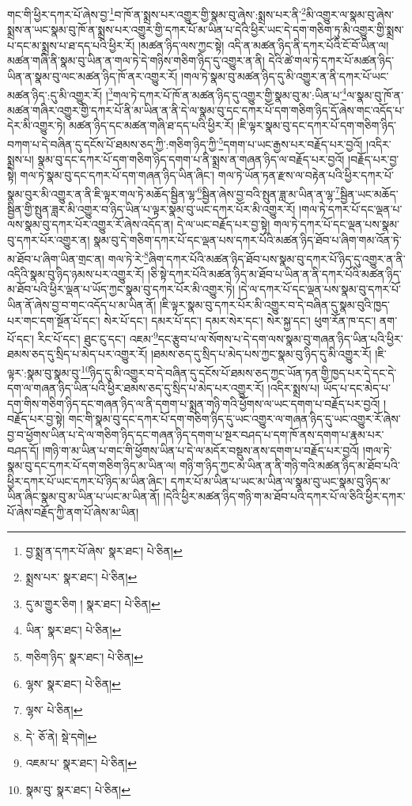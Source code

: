 གང་གི་ཕྱིར་དཀར་པོ་ཞེས་བྱ་\footnote{བྱ་སྨྲ་ན་དཀར་པོ་ཞེས་  སྣར་ཐང་།  པེ་ཅིན། }བ་ཁོ་ན་སྨྲས་པར་འགྱུར་གྱི་སྣམ་བུ་ཞེས་:སྨྲས་པར་ནི་\footnote{སྨྲས་པར་  སྣར་ཐང་།  པེ་ཅིན། }མི་འགྱུར་ལ་སྣམ་བུ་ཞེས་སྨྲས་ན་ཡང་སྣམ་བུ་ཁོ་ན་སྨྲས་པར་འགྱུར་གྱི་དཀར་པོ་མ་ཡིན་པ་དེའི་ཕྱིར་ཡང་དེ་དག་གཅིག་ཏུ་མི་འགྱུར་གྱི་སྨྲས་པ་དང་མ་སྨྲས་པ་ཐ་དད་པའི་ཕྱིར་རོ། །མཚན་ཉིད་ལས་ཀྱང་སྟེ། འདི་ན་མཚན་ཉིད་ནི་དཀར་པོའི་ངོ་བོ་ཡིན་ལ། མཚན་གཞི་ནི་སྣམ་བུ་ཡིན་ན་གལ་ཏེ་དེ་གཉིས་གཅིག་ཉིད་དུ་འགྱུར་ན་ནི། དེའི་ཚེ་གལ་ཏེ་དཀར་པོ་མཚན་ཉིད་ཡིན་ན་སྣམ་བུ་ལང་མཚན་ཉིད་ཁོ་ནར་འགྱུར་རོ། །གལ་ཏེ་སྣམ་བུ་མཚན་ཉིད་དུ་མི་འགྱུར་ན་ནི་དཀར་པོ་ཡང་མཚན་ཉིད་:དུ་མི་འགྱུར་རོ། །\footnote{དུ་མ་གྱུར་ཅིག །  སྣར་ཐང་།  པེ་ཅིན། }གལ་ཏེ་དཀར་པོ་ཁོ་ན་མཚན་ཉིད་དུ་འགྱུར་གྱི་སྣམ་བུ་མ་:ཡིན་པ་\footnote{ཡིན་  སྣར་ཐང་།  པེ་ཅིན། }ལ་སྣམ་བུ་ཁོ་ན་མཚན་གཞིར་འགྱུར་གྱི་དཀར་པོ་ནི་མ་ཡིན་ན་ནི་དེ་ལ་སྣམ་བུ་དང་དཀར་པོ་དག་གཅིག་ཉིད་དོ་ཞེས་གང་འདོད་པ་དེར་མི་འགྱུར་ཏེ། མཚན་ཉིད་དང་མཚན་གཞི་ཐ་དད་པའི་ཕྱིར་རོ། །ཇི་ལྟར་སྣམ་བུ་དང་དཀར་པོ་དག་གཅིག་ཉིད་བཀག་པ་དེ་བཞིན་དུ་དངོས་པོ་ཐམས་ཅད་ཀྱི་:གཅིག་ཉིད་ཀྱི་\footnote{གཅིག་ཉིད་  སྣར་ཐང་།  པེ་ཅིན། }དགག་པ་ཡང་རྒྱས་པར་བརྗོད་པར་བྱའོ། །འདིར་སྨྲས་པ། སྣམ་བུ་དང་དཀར་པོ་དག་གཅིག་ཉིད་དགག་པ་ནི་སྨྲས་ན་གཞན་ཉིད་ལ་བརྗོད་པར་བྱའོ། །བརྗོད་པར་བྱ་སྟེ། གལ་ཏེ་སྣམ་བུ་དང་དཀར་པོ་དག་གཞན་ཉིད་ཡིན་ཞིང་། གལ་ཏེ་ཡོན་ཏན་རྫས་ལ་བརྟེན་པའི་ཕྱིར་དཀར་པོ་སྣམ་བུར་མི་འགྱུར་ན་ནི་ཇི་ལྟར་གལ་ཏེ་མཆོད་སྦྱིན་ལྷ་\footnote{ལྷས་  སྣར་ཐང་།  པེ་ཅིན། }སྦྱིན་ཞེས་བྱ་བའི་སྤུན་ཟླ་མ་ཡིན་ན་ལྷ་\footnote{ལྷས་  པེ་ཅིན། }སྦྱིན་ཡང་མཆོད་སྦྱིན་གྱི་སྤུན་ཟླར་མི་འགྱུར་བ་ཉིད་ཡིན་པ་ལྟར་སྣམ་བུ་ཡང་དཀར་པོར་མི་འགྱུར་རོ། །གལ་ཏེ་དཀར་པོ་དང་ལྡན་པ་ལས་སྣམ་བུ་དཀར་པོར་འགྱུར་རོ་ཞེས་འདོད་ན། དེ་ལ་ཡང་བརྗོད་པར་བྱ་སྟེ། གལ་ཏེ་དཀར་པོ་དང་ལྡན་པས་སྣམ་བུ་དཀར་པོར་འགྱུར་ན། སྣམ་བུ་དེ་གཅིག་དཀར་པོ་དང་ལྡན་པས་དཀར་པོའི་མཚན་ཉིད་ཐོབ་པ་ཞིག་གམ་འོན་ཏེ་མ་ཐོབ་པ་ཞིག་ཡིན་གྲང་ན། གལ་ཏེ་རེ་\footnote{དེ་  ཅོ་ནེ།  སྡེ་དགེ། }ཞིག་དཀར་པོའི་མཚན་ཉིད་ཐོབ་པས་སྣམ་བུ་དཀར་པོ་ཉིད་དུ་འགྱུར་ན་ནི་འདིའི་སྣམ་བུ་ཉིད་ཉམས་པར་འགྱུར་རོ། །ཅི་སྟེ་དཀར་པོའི་མཚན་ཉིད་མ་ཐོབ་པ་ཡིན་ན་ནི་དཀར་པོའི་མཚན་ཉིད་མ་ཐོབ་པའི་ཕྱིར་ལྡན་པ་ཡོད་ཀྱང་སྣམ་བུ་དཀར་པོར་མི་འགྱུར་ཏེ། །དེ་ལ་དཀར་པོ་དང་ལྡན་པས་སྣམ་བུ་དཀར་པོ་ཡིན་ནོ་ཞེས་བྱ་བ་གང་འདོད་པ་མ་ཡིན་ནོ། །ཇི་ལྟར་སྣམ་བུ་དཀར་པོར་མི་འགྱུར་བ་དེ་བཞིན་དུ་སྣམ་བུའི་ཁྱད་པར་གང་དག་སྔོན་པོ་དང་། སེར་པོ་དང་། དམར་པོ་དང་། དམར་སེར་དང་། སེར་སྐྱ་དང་། ཕུག་རོན་ཁ་དང་། ནག་པོ་དང་། རིང་པོ་དང་། ཐུང་ངུ་དང་། འཇམ་\footnote{འཇམ་པ་  སྣར་ཐང་།  པེ་ཅིན། }དང་རྩུབ་པ་ལ་སོགས་པ་དེ་དག་ལས་སྣམ་བུ་གཞན་ཉིད་ཡིན་པའི་ཕྱིར་ཐམས་ཅད་དུ་སྲིད་པ་མེད་པར་འགྱུར་རོ། །ཐམས་ཅད་དུ་སྲིད་པ་མེད་པས་ཀྱང་སྣམ་བུ་ཉིད་དུ་མི་འགྱུར་རོ། །ཇི་ལྟར་:སྣམ་བུ་སྣམ་བུ་\footnote{སྣམ་བུ་  སྣར་ཐང་།  པེ་ཅིན། }ཉིད་དུ་མི་འགྱུར་བ་དེ་བཞིན་དུ་དངོས་པོ་ཐམས་ཅད་ཀྱང་ཡོན་ཏན་གྱི་ཁྱད་པར་དེ་དང་དེ་དག་ལ་གཞན་ཉིད་ཡིན་པའི་ཕྱིར་ཐམས་ཅད་དུ་སྲིད་པ་མེད་པར་འགྱུར་རོ། །འདིར་སྨྲས་པ། ཡོད་པ་དང་མེད་པ་དག་གིས་གཅིག་ཉིད་དང་གཞན་ཉིད་ལ་ནི་དགག་པ་སྨྲན་གཉི་གའི་ཕྱོགས་ལ་ཡང་དགག་པ་བརྗོད་པར་བྱའོ། །བརྗོད་པར་བྱ་སྟེ། གང་གི་སྣམ་བུ་དང་དཀར་པོ་དག་གཅིག་ཉིད་དུ་ཡང་འགྱུར་ལ་གཞན་ཉིད་དུ་ཡང་འགྱུར་རོ་ཞེས་བྱ་བ་ཕྱོགས་ཡིན་པ་དེ་ལ་གཅིག་ཉིད་དང་གཞན་ཉིད་དགག་པ་སྔར་བཤད་པ་དག་ཁོ་ནས་དགག་པ་རྣམ་པར་བཤད་དོ། །གཉི་ག་མ་ཡིན་པ་གང་གི་ཕྱོགས་ཡིན་པ་དེ་ལ་མདོར་བསྡུས་ནས་དགག་པ་བརྗོད་པར་བྱའོ། །གལ་ཏེ་སྣམ་བུ་དང་དཀར་པོ་དག་གཅིག་ཉིད་མ་ཡིན་ལ། གཉི་ག་ཉིད་ཀྱང་མ་ཡིན་ན་ནི་གཉི་གའི་མཚན་ཉིད་མ་ཐོབ་པའི་ཕྱིར་དཀར་པོ་ཡང་དཀར་པོ་ཉིད་མ་ཡིན་ཞིང་། དཀར་པོ་མ་ཡིན་པ་ཡང་མ་ཡིན་ལ་སྣམ་བུ་ཡང་སྣམ་བུ་ཉིད་མ་ཡིན་ཞིང་སྣམ་བུ་མ་ཡིན་པ་ཡང་མ་ཡིན་ནོ། །དེའི་ཕྱིར་མཚན་ཉིད་གཉི་ག་མ་ཐོབ་པའི་དཀར་པོ་ལ་ཅིའི་ཕྱིར་དཀར་པོ་ཞེས་བརྗོད་ཀྱི་ནག་པོ་ཞེས་མ་ཡིན། 